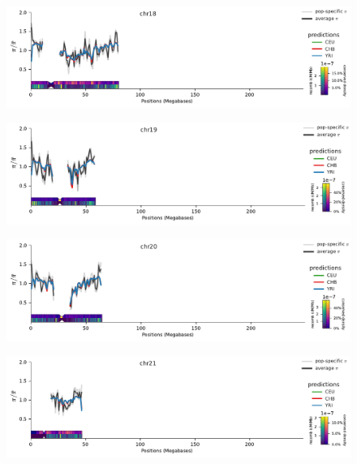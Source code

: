 \documentclass[11pt]{article}
\begin{document}
\begin{figure}[!htb]
  \centering
  \includegraphics[width=\textwidth]{figures/supplementary/pred_plot_chr18.pdf}
  \label{suppfig:fit-chr18}
\end{figure}


\begin{figure}[!htb]
  \centering
  \includegraphics[width=\textwidth]{figures/supplementary/pred_plot_chr19.pdf}
  \label{suppfig:fit-chr19}
\end{figure}


\begin{figure}[!htb]
  \centering
  \includegraphics[width=\textwidth]{figures/supplementary/pred_plot_chr20.pdf}
  \label{suppfig:fit-chr20}
\end{figure}


\begin{figure}[!htb]
  \centering
  \includegraphics[width=\textwidth]{figures/supplementary/pred_plot_chr21.pdf}
  \label{suppfig:fit-chr21}
\end{figure}
\end{document}
